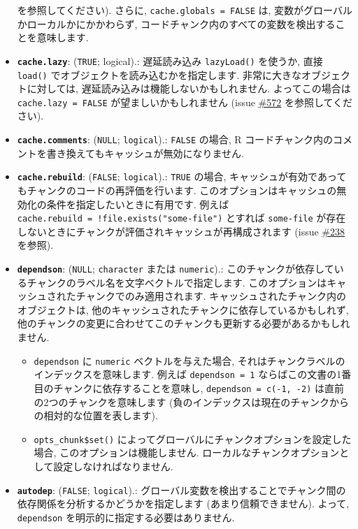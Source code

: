 \documentclass[
  lualatex,ja=standard,jafont=noto-otf]{bxjsreport}
\providecommand{\tightlist}{%
  \setlength{\itemsep}{0pt}\setlength{\parskip}{0pt}}
\begin{document}
\begin{itemize}
  を参照してください). さらに, \texttt{cache.globals\ =\ FALSE} は,
  変数がグローバルかローカルかにかかわらず,
  コードチャンク内のすべての変数を検出することを意味します.
\item
  \textbf{\texttt{cache.lazy}}: (\texttt{TRUE}; logical).: 遅延読み込み
  \texttt{lazyLoad()} を使うか, 直接 \texttt{load()}
  でオブジェクトを読み込むかを指定します.
  非常に大きなオブジェクトに対しては,
  遅延読み込みは機能しないかもしれません. よってこの場合は
  \texttt{cache.lazy\ =\ FALSE} が望ましいかもしれません (issue
  \href{https://github.com/yihui/knitr/issues/572}{\#572}
  を参照してください).
\item
  \textbf{\texttt{cache.comments}}: (\texttt{NULL}; \texttt{logical}).:
  \texttt{FALSE} の場合, R
  コードチャンク内のコメントを書き換えてもキャッシュが無効になりません.
\item
  \textbf{\texttt{cache.rebuild}}: (\texttt{FALSE}; \texttt{logical}).:
  \texttt{TRUE} の場合,
  キャッシュが有効であってもチャンクのコードの再評価を行います.
  このオプションはキャッシュの無効化の条件を指定したいときに有用です.
  例えば \texttt{cache.rebuild\ =\ !file.exists("some-file")} とすれば
  \texttt{some-file}
  が存在しないときにチャンクが評価されキャッシュが再構成されます (issue
  \href{https://github.com/yihui/knitr/issues/238}{\#238} を参照).
\item
  \textbf{\texttt{dependson}}: (\texttt{NULL}; \texttt{character} または
  \texttt{numeric}).:
  このチャンクが依存しているチャンクのラベル名を文字ベクトルで指定します.
  このオプションはキャッシュされたチャンクでのみ適用されます.
  キャッシュされたチャンク内のオブジェクトは,
  他のキャッシュされたチャンクに依存しているかもしれず,
  他のチャンクの変更に合わせてこのチャンクも更新する必要があるかもしれません.

  \begin{itemize}
  \tightlist
  \item
    \texttt{dependson} に \texttt{numeric} ベクトルを与えた場合,
    それはチャンクラベルのインデックスを意味します. 例えば
    \texttt{dependson\ =\ 1}
    ならばこの文書の1番目のチャンクに依存することを意味し,
    \texttt{dependson\ =\ c(-1,\ -2)} は直前の2つのチャンクを意味します
    (負のインデックスは現在のチャンクからの相対的な位置を表します).
  \item
    \texttt{opts\_chunk\$set()}
    によってグローバルにチャンクオプションを設定した場合,
    このオプションは機能しません.
    ローカルなチャンクオプションとして設定しなければなりません.
  \end{itemize}
\item
  \textbf{\texttt{autodep}}: (\texttt{FALSE}; \texttt{logical}).:
  グローバル変数を検出することでチャンク間の依存関係を分析するかどうかを指定します
  (あまり信頼できません). よって, \texttt{dependson}
  を明示的に指定する必要はありません.
\end{itemize}
\end{document}
